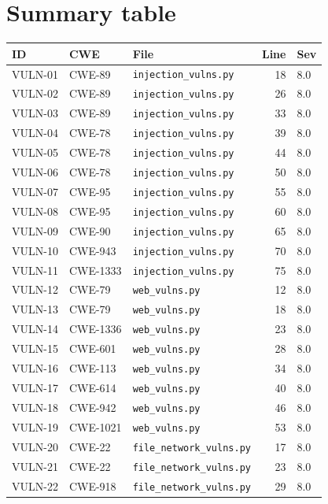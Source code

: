 \documentclass[11pt,a4paper]{article}
\begin{document}
\section{Summary table}
\renewcommand{\arraystretch}{1.15}
\begin{longtable}{@{}l l l r l@{}}
\toprule \textbf{ID} & \textbf{CWE} & \textbf{File} & \textbf{Line} & \textbf{Sev} \\ \midrule \endhead
VULN-01 & CWE-89 & \texttt{injection\_vulns.py} & 18 & 8.0 \\
VULN-02 & CWE-89 & \texttt{injection\_vulns.py} & 26 & 8.0 \\
VULN-03 & CWE-89 & \texttt{injection\_vulns.py} & 33 & 8.0 \\
VULN-04 & CWE-78 & \texttt{injection\_vulns.py} & 39 & 8.0 \\
VULN-05 & CWE-78 & \texttt{injection\_vulns.py} & 44 & 8.0 \\
VULN-06 & CWE-78 & \texttt{injection\_vulns.py} & 50 & 8.0 \\
VULN-07 & CWE-95 & \texttt{injection\_vulns.py} & 55 & 8.0 \\
VULN-08 & CWE-95 & \texttt{injection\_vulns.py} & 60 & 8.0 \\
VULN-09 & CWE-90 & \texttt{injection\_vulns.py} & 65 & 8.0 \\
VULN-10 & CWE-943 & \texttt{injection\_vulns.py} & 70 & 8.0 \\
VULN-11 & CWE-1333 & \texttt{injection\_vulns.py} & 75 & 8.0 \\
VULN-12 & CWE-79 & \texttt{web\_vulns.py} & 12 & 8.0 \\
VULN-13 & CWE-79 & \texttt{web\_vulns.py} & 18 & 8.0 \\
VULN-14 & CWE-1336 & \texttt{web\_vulns.py} & 23 & 8.0 \\
VULN-15 & CWE-601 & \texttt{web\_vulns.py} & 28 & 8.0 \\
VULN-16 & CWE-113 & \texttt{web\_vulns.py} & 34 & 8.0 \\
VULN-17 & CWE-614 & \texttt{web\_vulns.py} & 40 & 8.0 \\
VULN-18 & CWE-942 & \texttt{web\_vulns.py} & 46 & 8.0 \\
VULN-19 & CWE-1021 & \texttt{web\_vulns.py} & 53 & 8.0 \\
VULN-20 & CWE-22 & \texttt{file\_network\_vulns.py} & 17 & 8.0 \\
VULN-21 & CWE-22 & \texttt{file\_network\_vulns.py} & 23 & 8.0 \\
VULN-22 & CWE-918 & \texttt{file\_network\_vulns.py} & 29 & 8.0 \\

\end{longtable}
\end{document}

